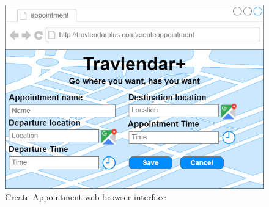 \begin{figure}[h]
\centering
\includegraphics[height=.4\textheight, keepaspectratio=true]{Img/CreateAppointmentDesktop}
\caption{Create Appointment web browser interface}
\end{figure}


